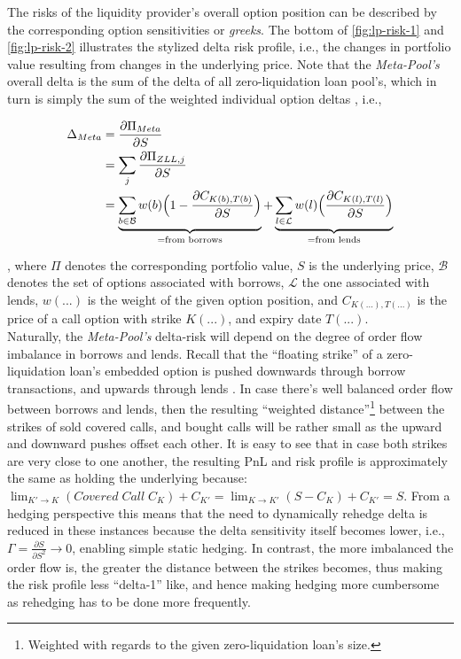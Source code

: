 \documentclass[a4paper]{article}
\begin{document}
The risks of the liquidity provider's overall option position can be described by the corresponding option sensitivities or \emph{greeks}. The bottom of \cref{fig:lp-risk-1} and \cref{fig:lp-risk-2} illustrates the stylized delta risk profile, i.e., the changes in portfolio value resulting from changes in the underlying price. Note that the \emph{Meta-Pool's} overall delta is the sum of the delta of all zero-liquidation loan pool's, which in turn is simply the sum of the weighted individual option deltas \cite{frei}, i.e.,

\begin{equation}
\begin{split}
\label{eq:delta-risk}
\small
\Delta_{Meta} &= \frac{\partial \Pi_{Meta}}{\partial S} \\
& = \sum_j \frac{\partial \Pi_{ZLL, j}}{\partial S} \\
& = \underbrace{\sum_{b \in \mathcal{B}} w(b) \Big( 1 - \frac{\partial C_{K(b), T(b)}}{\partial S} \Big) }_{\textrm{=from borrows}} + \underbrace{\sum_{l \in \mathcal{L}} w(l) \Big( \frac{\partial C_{K(l), T(l)}}{\partial S} \Big) }_{\textrm{=from lends}}
\end{split}
\end{equation}

, where $\Pi$ denotes the corresponding portfolio value, $S$ is the underlying price, $\mathcal{B}$ denotes the set of options associated with borrows, $\mathcal{L}$ the one associated with lends, $w(...)$ is the weight of the given option position, and $C_{K(...), T(...)}$ is the price of a call option with strike $K(...)$, and expiry date $T(...)$.\\

Naturally, the \emph{Meta-Pool's} delta-risk will depend on the degree of order flow imbalance in borrows and lends. Recall that the ``floating strike'' of a zero-liquidation loan's embedded option is pushed downwards through borrow transactions, and upwards through lends \cite{sardon}. In case there's well balanced order flow between borrows and lends, then the resulting ``weighted distance''\footnote{Weighted with regards to the given zero-liquidation loan's size.} between the strikes of sold covered calls, and bought calls will be rather small as the upward and downward pushes offset each other. It is easy to see that in case both strikes are very close to one another, the resulting PnL and risk profile is approximately the same as holding the underlying because: $\lim_{K'\to K} (Covered \; Call \; C_{K}) + C_{K'}=\lim_{K\to K'}(S - C_{K})+C_{K'}=S$. From a hedging perspective this means that the need to dynamically rehedge delta is reduced in these instances because the delta sensitivity itself becomes lower, i.e., $\Gamma = \frac{\partial S}{\partial S^2} \to 0$, enabling simple static hedging. In contrast, the more imbalanced the order flow is, the greater the distance between the strikes becomes, thus making the risk profile less ``delta-1'' like, and hence making hedging more cumbersome as rehedging has to be done more frequently. 
\end{document}
